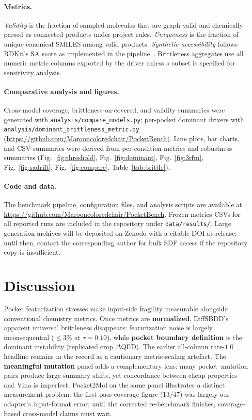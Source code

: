 \documentclass[11pt]{article}
\begin{document}
\paragraph{Metrics.}
\emph{Validity} is the fraction of sampled molecules that are graph-valid and chemically parsed as connected products under project rules. \emph{Uniqueness} is the fraction of unique canonical SMILES among valid products. \emph{Synthetic accessibility} follows RDKit's SA score as implemented in the pipeline~\cite{ertl2009sa}. Brittleness aggregates use all numeric metric columns exported by the driver unless a subset is specified for sensitivity analysis.

\paragraph{Comparative analysis and figures.}
Cross-model coverage, brittleness-on-covered, and validity summaries were generated with \texttt{analysis/compare\_models.py}; per-pocket dominant drivers with \texttt{analysis/dominant\_brittleness\_metric.py} (\url{https://github.com/Marooncoloredchair/PocketBench}). Line plots, bar charts, and CSV summaries were derived from per-condition metrics and robustness summaries (Fig.~\ref{fig:threshold}, Fig.~\ref{fig:dominant}, Fig.~\ref{fig:3rfm}, Fig.~\ref{fig:sadrift}, Fig.~\ref{fig:compare}, Table~\ref{tab:brittle}).

\paragraph{Code and data.}
The benchmark pipeline, configuration files, and analysis scripts are available at \url{https://github.com/Marooncoloredchair/PocketBench}. Frozen metrics CSVs for all reported runs are included in the repository under \texttt{data/results/}. Large generation archives will be deposited on Zenodo with a citable DOI at release; until then, contact the corresponding author for bulk SDF access if the repository copy is insufficient.

\section{Discussion}

Pocket featurization stresses make input-side fragility measurable alongside conventional chemistry metrics. Once metrics are \textbf{normalized}, DiffSBDD's apparent universal brittleness disappears: featurization noise is largely inconsequential ($\leq 3\%$ at $\tau=0.10$), while \textbf{pocket boundary definition} is the dominant instability (replicated crop $\Delta$QED). The earlier all-column rate-$1.0$ headline remains in the record as a cautionary metric-scaling artefact. The \textbf{meaningful mutation} panel adds a complementary lens: many pocket--mutation pairs produce large summary shifts, yet concordance between cheap properties and Vina is imperfect. Pocket2Mol on the same panel illustrates a distinct measurement problem: the first-pass coverage figure (13/47) was largely our adapter's input-format error; until the corrected re-benchmark finishes, coverage-based cross-model claims must wait.
\end{document}
